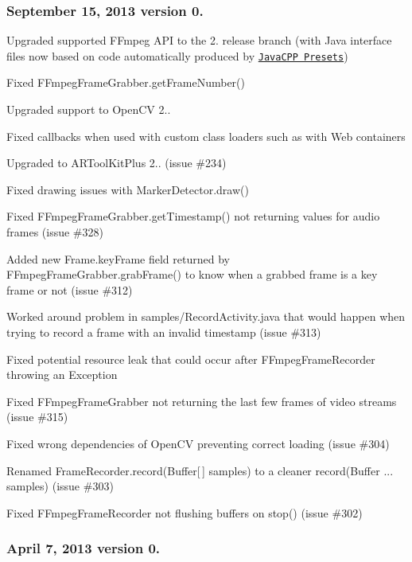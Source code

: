 \subsubsection*{September 15, 2013 version 0.}


\begin{DoxyItemize}
\item Upgraded supported F\+Fmpeg A\+P\+I to the 2. release branch (with Java interface files now based on code automatically produced by \href{https://github.com/bytedeco/javacpp-presets}{\tt Java\+C\+P\+P Presets})
\item Fixed {\ttfamily F\+Fmpeg\+Frame\+Grabber.\+get\+Frame\+Number()}
\item Upgraded support to Open\+C\+V 2..
\item Fixed callbacks when used with custom class loaders such as with Web containers
\item Upgraded to A\+R\+Tool\+Kit\+Plus 2.. (issue \#234)
\item Fixed drawing issues with {\ttfamily Marker\+Detector.\+draw()}
\item Fixed {\ttfamily F\+Fmpeg\+Frame\+Grabber.\+get\+Timestamp()} not returning values for audio frames (issue \#328)
\item Added new {\ttfamily Frame.\+key\+Frame} field returned by {\ttfamily F\+Fmpeg\+Frame\+Grabber.\+grab\+Frame()} to know when a grabbed frame is a key frame or not (issue \#312)
\item Worked around problem in {\ttfamily samples/\+Record\+Activity.\+java} that would happen when trying to record a frame with an invalid timestamp (issue \#313)
\item Fixed potential resource leak that could occur after {\ttfamily F\+Fmpeg\+Frame\+Recorder} throwing an {\ttfamily Exception}
\item Fixed {\ttfamily F\+Fmpeg\+Frame\+Grabber} not returning the last few frames of video streams (issue \#315)
\item Fixed wrong dependencies of Open\+C\+V preventing correct loading (issue \#304)
\item Renamed {\ttfamily Frame\+Recorder.\+record(\+Buffer\mbox{[}$\,$\mbox{]} samples)} to a cleaner {\ttfamily record(Buffer ... samples)} (issue \#303)
\item Fixed {\ttfamily F\+Fmpeg\+Frame\+Recorder} not flushing buffers on {\ttfamily stop()} (issue \#302)
\end{DoxyItemize}

\subsubsection*{April 7, 2013 version 0.}


